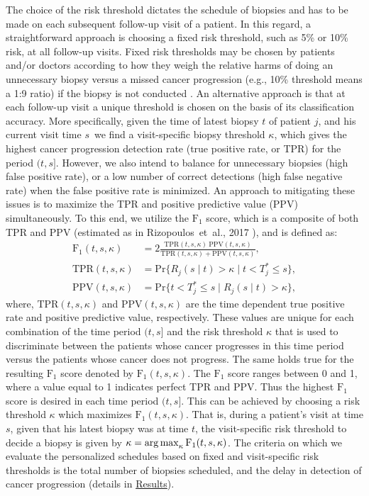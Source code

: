 The choice of the risk threshold dictates the schedule of biopsies and has to be made on each subsequent follow-up visit of a patient. In this regard, a straightforward approach is choosing a fixed risk threshold, such as 5\% or 10\% risk, at all follow-up visits. Fixed risk thresholds may be chosen by patients and/or doctors according to how they weigh the relative harms of doing an unnecessary biopsy versus a missed cancer progression (e.g., 10\% threshold means a 1:9 ratio) if the biopsy is not conducted \cite{vickers2006decision}. An alternative approach is that at each follow-up visit a unique threshold is chosen on the basis of its classification accuracy. More specifically, given the time of latest biopsy $t$ of patient $j$, and his current visit time $s$\, we find a visit-specific biopsy threshold $\kappa$, which gives the highest cancer progression detection rate (true positive rate, or TPR) for the period $(t, s]$. However, we also intend to balance for unnecessary biopsies (high false positive rate), or a low number of correct detections (high false negative rate) when the false positive rate is minimized. An approach to mitigating these issues is to maximize the TPR and positive predictive value (PPV) simultaneously. To this end, we utilize the $\mbox{F}_1$ score, which is a composite of both TPR and PPV (estimated as in Rizopoulos~et~al., 2017 \cite{landmarking2017}), and is defined as: 
\begin{equation}
\label{eq:F1_TPR_PPV}
\begin{split}
\mbox{F}_1(t,  s, \kappa) &= 2\frac{\mbox{TPR}(t,  s, \kappa)\ \mbox{PPV}(t,  s, \kappa)}{\mbox{TPR}(t,  s, \kappa) + \mbox{PPV}(t,  s, \kappa)},\\
\mbox{TPR}(t,  s, \kappa) &= \mbox{Pr}\big\{R_j(s \mid t) > \kappa \mid t < T^*_j \leq s\big\},\\
\mbox{PPV}(t,  s, \kappa) &= \mbox{Pr}\big\{t < T^*_j \leq s \mid R_j(s \mid t) > \kappa \big\},
\end{split}
\end{equation}
where, $\mbox{TPR}(t,  s, \kappa)$ and $\mbox{PPV}(t,  s, \kappa)$ are the time dependent true positive rate and positive predictive value, respectively. These values are unique for each combination of the time period $(t, s]$ and the risk threshold $\kappa$ that is used to discriminate between the patients whose cancer progresses in this time period versus the patients whose cancer does not progress. The same holds true for the resulting $\mbox{F}_1$ score denoted by $\mbox{F}_1(t,  s, \kappa)$. The $\mbox{F}_1$ score ranges between 0 and 1, where a value equal to 1 indicates perfect TPR and PPV. Thus the highest $\mbox{F}_1$ score is desired in each time period $(t, s]$. This can be achieved by choosing a risk threshold $\kappa$ which maximizes $\mbox{F}_1(t, s, \kappa)$. That is, during a patient's visit at time $s$, given that his latest biopsy was at time $t$, the visit-specific risk threshold to decide a biopsy is given by ${\kappa=\operatorname{arg\,max}_{\kappa} \mbox{F}_1(t, s, \kappa)}$. The criteria on which we evaluate the personalized schedules based on fixed and visit-specific risk thresholds is the total number of biopsies scheduled, and the delay in detection of cancer progression (details in \hyperref[sec:results]{Results}).
